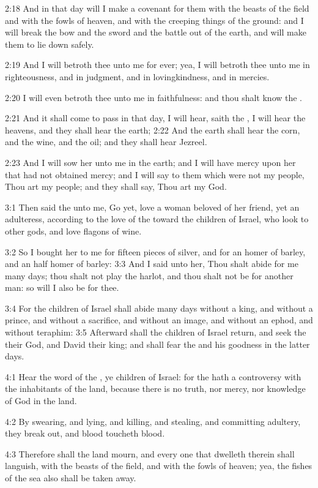 2:18 And in that day will I make a covenant for them with the beasts of the field and with the fowls of heaven, and with the creeping things of the ground: and I will break the bow and the sword and the battle out of the earth, and will make them to lie down safely.

2:19 And I will betroth thee unto me for ever; yea, I will betroth thee unto me in righteousness, and in judgment, and in lovingkindness, and in mercies.

2:20 I will even betroth thee unto me in faithfulness: and thou shalt know the \LORD.

2:21 And it shall come to pass in that day, I will hear, saith the \LORD, I will hear the heavens, and they shall hear the earth; 2:22 And the earth shall hear the corn, and the wine, and the oil; and they shall hear Jezreel.

2:23 And I will sow her unto me in the earth; and I will have mercy upon her that had not obtained mercy; and I will say to them which were not my people, Thou art my people; and they shall say, Thou art my God.

3:1 Then said the \LORD unto me, Go yet, love a woman beloved of her friend, yet an adulteress, according to the love of the \LORD toward the children of Israel, who look to other gods, and love flagons of wine.

3:2 So I bought her to me for fifteen pieces of silver, and for an homer of barley, and an half homer of barley: 3:3 And I said unto her, Thou shalt abide for me many days; thou shalt not play the harlot, and thou shalt not be for another man: so will I also be for thee.

3:4 For the children of Israel shall abide many days without a king, and without a prince, and without a sacrifice, and without an image, and without an ephod, and without teraphim: 3:5 Afterward shall the children of Israel return, and seek the \LORD their God, and David their king; and shall fear the \LORD and his goodness in the latter days.

4:1 Hear the word of the \LORD, ye children of Israel: for the \LORD hath a controversy with the inhabitants of the land, because there is no truth, nor mercy, nor knowledge of God in the land.

4:2 By swearing, and lying, and killing, and stealing, and committing adultery, they break out, and blood toucheth blood.

4:3 Therefore shall the land mourn, and every one that dwelleth therein shall languish, with the beasts of the field, and with the fowls of heaven; yea, the fishes of the sea also shall be taken away.

